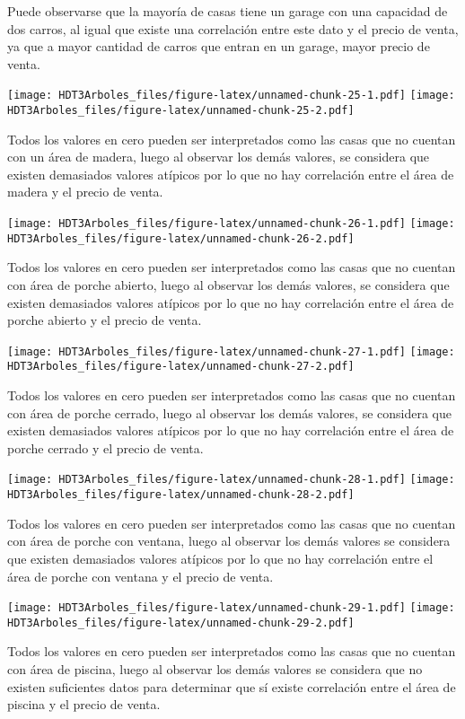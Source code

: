\documentclass[
]{article}
\begin{document}
Puede observarse que la mayoría de casas tiene un garage con una
capacidad de dos carros, al igual que existe una correlación entre este
dato y el precio de venta, ya que a mayor cantidad de carros que entran
en un garage, mayor precio de venta.

\texttt{[image: HDT3Arboles\_files/figure-latex/unnamed-chunk-25-1.pdf]}
\texttt{[image: HDT3Arboles\_files/figure-latex/unnamed-chunk-25-2.pdf]}

Todos los valores en cero pueden ser interpretados como las casas que no
cuentan con un área de madera, luego al observar los demás valores, se
considera que existen demasiados valores atípicos por lo que no hay
correlación entre el área de madera y el precio de venta.

\texttt{[image: HDT3Arboles\_files/figure-latex/unnamed-chunk-26-1.pdf]}
\texttt{[image: HDT3Arboles\_files/figure-latex/unnamed-chunk-26-2.pdf]}

Todos los valores en cero pueden ser interpretados como las casas que no
cuentan con área de porche abierto, luego al observar los demás valores,
se considera que existen demasiados valores atípicos por lo que no hay
correlación entre el área de porche abierto y el precio de venta.

\texttt{[image: HDT3Arboles\_files/figure-latex/unnamed-chunk-27-1.pdf]}
\texttt{[image: HDT3Arboles\_files/figure-latex/unnamed-chunk-27-2.pdf]}

Todos los valores en cero pueden ser interpretados como las casas que no
cuentan con área de porche cerrado, luego al observar los demás valores,
se considera que existen demasiados valores atípicos por lo que no hay
correlación entre el área de porche cerrado y el precio de venta.

\texttt{[image: HDT3Arboles\_files/figure-latex/unnamed-chunk-28-1.pdf]}
\texttt{[image: HDT3Arboles\_files/figure-latex/unnamed-chunk-28-2.pdf]}

Todos los valores en cero pueden ser interpretados como las casas que no
cuentan con área de porche con ventana, luego al observar los demás
valores se considera que existen demasiados valores atípicos por lo que
no hay correlación entre el área de porche con ventana y el precio de
venta.

\texttt{[image: HDT3Arboles\_files/figure-latex/unnamed-chunk-29-1.pdf]}
\texttt{[image: HDT3Arboles\_files/figure-latex/unnamed-chunk-29-2.pdf]}

Todos los valores en cero pueden ser interpretados como las casas que no
cuentan con área de piscina, luego al observar los demás valores se
considera que no existen suficientes datos para determinar que sí existe
correlación entre el área de piscina y el precio de venta.
\end{document}
